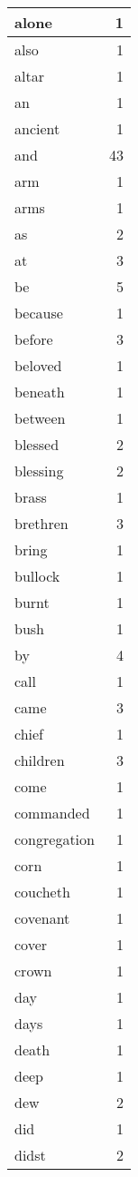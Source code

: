 \begin{center}
\begin{longtable}{l|r}
alone & 1 \\ \hline
also & 1 \\ \hline
altar & 1 \\ \hline
an & 1 \\ \hline
ancient & 1 \\ \hline
and & 43 \\ \hline
arm & 1 \\ \hline
arms & 1 \\ \hline
as & 2 \\ \hline
at & 3 \\ \hline
be & 5 \\ \hline
because & 1 \\ \hline
before & 3 \\ \hline
beloved & 1 \\ \hline
beneath & 1 \\ \hline
between & 1 \\ \hline
blessed & 2 \\ \hline
blessing & 2 \\ \hline
brass & 1 \\ \hline
brethren & 3 \\ \hline
bring & 1 \\ \hline
bullock & 1 \\ \hline
burnt & 1 \\ \hline
bush & 1 \\ \hline
by & 4 \\ \hline
call & 1 \\ \hline
came & 3 \\ \hline
chief & 1 \\ \hline
children & 3 \\ \hline
come & 1 \\ \hline
commanded & 1 \\ \hline
congregation & 1 \\ \hline
corn & 1 \\ \hline
coucheth & 1 \\ \hline
covenant & 1 \\ \hline
cover & 1 \\ \hline
crown & 1 \\ \hline
day & 1 \\ \hline
days & 1 \\ \hline
death & 1 \\ \hline
deep & 1 \\ \hline
dew & 2 \\ \hline
did & 1 \\ \hline
didst & 2 \\ \hline

\end{longtable}
\end{center}
